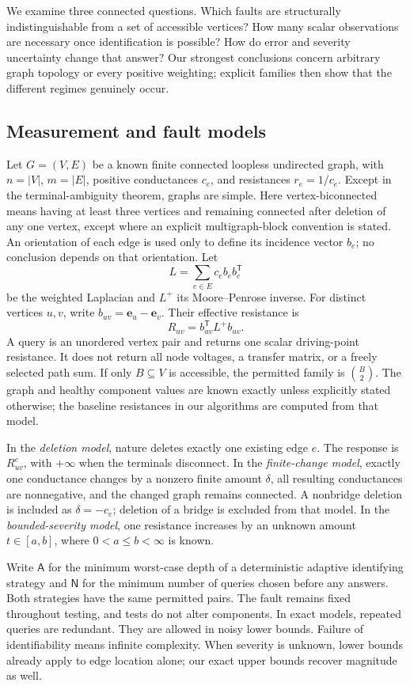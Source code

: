 \documentclass[11pt,letterpaper]{article}
\newcommand{\A}{\mathsf A}
\newcommand{\N}{\mathsf N}
\begin{document}
We examine three connected questions. Which faults are structurally indistinguishable from a set of accessible vertices? How many scalar observations are necessary once identification is possible? How do error and severity uncertainty change that answer? Our strongest conclusions concern arbitrary graph topology or every positive weighting; explicit families then show that the different regimes genuinely occur.

\subsection{Measurement and fault models}
Let $G=(V,E)$ be a known finite connected loopless undirected graph, with $n=|V|$, $m=|E|$, positive conductances $c_e$, and resistances $r_e=1/c_e$. Except in the terminal-ambiguity theorem, graphs are simple. Here vertex-biconnected means having at least three vertices and remaining connected after deletion of any one vertex, except where an explicit multigraph-block convention is stated. An orientation of each edge is used only to define its incidence vector $b_e$; no conclusion depends on that orientation. Let
\[
 L=\sum_{e\in E}c_e b_e b_e^{\mathsf T}
\]
be the weighted Laplacian and $L^+$ its Moore--Penrose inverse. For distinct vertices $u,v$, write $b_{uv}=\mathbf e_u-\mathbf e_v$. Their effective resistance is
\[
 R_{uv}=b_{uv}^{\mathsf T}L^+b_{uv}.
\]
A query is an unordered vertex pair and returns one scalar driving-point resistance. It does not return all node voltages, a transfer matrix, or a freely selected path sum. If only $B\subseteq V$ is accessible, the permitted family is $\binom B2$. The graph and healthy component values are known exactly unless explicitly stated otherwise; the baseline resistances in our algorithms are computed from that model.

In the \emph{deletion model}, nature deletes exactly one existing edge $e$. The response is $R^e_{uv}$, with $+\infty$ when the terminals disconnect. In the \emph{finite-change model}, exactly one conductance changes by a nonzero finite amount $\delta$, all resulting conductances are nonnegative, and the changed graph remains connected. A nonbridge deletion is included as $\delta=-c_e$; deletion of a bridge is excluded from that model. In the \emph{bounded-severity model}, one resistance increases by an unknown amount $t\in[a,b]$, where $0<a\le b<\infty$ is known.

Write $\A$ for the minimum worst-case depth of a deterministic adaptive identifying strategy and $\N$ for the minimum number of queries chosen before any answers. Both strategies have the same permitted pairs. The fault remains fixed throughout testing, and tests do not alter components. In exact models, repeated queries are redundant. They are allowed in noisy lower bounds. Failure of identifiability means infinite complexity. When severity is unknown, lower bounds already apply to edge location alone; our exact upper bounds recover magnitude as well.
\end{document}
